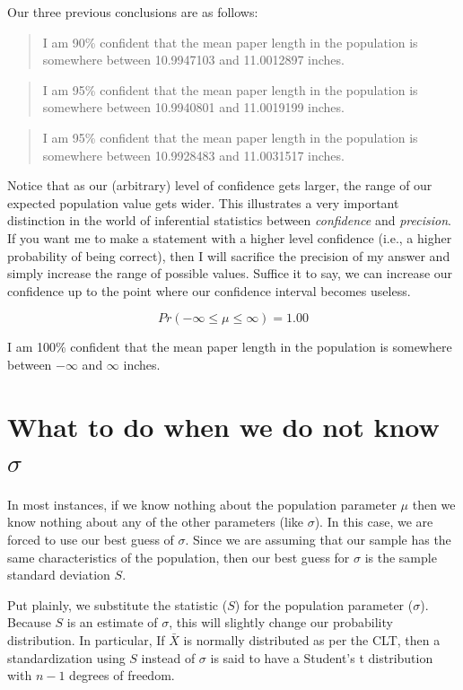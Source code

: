 \documentclass[
]{book}
\begin{document}
Our three previous conclusions are as follows:

\begin{quote}
I am 90\% confident that the mean paper length in the population is somewhere between 10.9947103 and 11.0012897 inches.
\end{quote}

\begin{quote}
I am 95\% confident that the mean paper length in the population is somewhere between 10.9940801 and 11.0019199 inches.
\end{quote}

\begin{quote}
I am 95\% confident that the mean paper length in the population is somewhere between 10.9928483 and 11.0031517 inches.
\end{quote}

Notice that as our (arbitrary) level of confidence gets larger, the range of our expected population value gets wider. This illustrates a very important distinction in the world of inferential statistics between \emph{confidence} and \emph{precision}. If you want me to make a statement with a higher level confidence (i.e., a higher probability of being correct), then I will sacrifice the precision of my answer and simply increase the range of possible values. Suffice it to say, we can increase our confidence up to the point where our confidence interval becomes useless.

\[ Pr(-\infty \leq \mu \leq \infty) = 1.00 \]

I am 100\% confident that the mean paper length in the population is somewhere between \(-\infty\) and \(\infty\) inches.

\hypertarget{what-to-do-when-we-do-not-know-sigma}{%
\section{\texorpdfstring{What to do when we do not know \(\sigma\)}{What to do when we do not know \textbackslash sigma}}\label{what-to-do-when-we-do-not-know-sigma}}

In most instances, if we know nothing about the population parameter \(\mu\) then we know nothing about any of the other parameters (like \(\sigma\)). In this case, we are forced to use our best guess of \(\sigma\). Since we are assuming that our sample has the same characteristics of the population, then our best guess for \(\sigma\) is the sample standard deviation \(S\).

Put plainly, we substitute the statistic (\(S\)) for the population parameter (\(\sigma\)). Because \(S\) is an estimate of \(\sigma\), this will slightly change our probability distribution. In particular, If \(\bar{X}\) is normally distributed as per the CLT, then a standardization using \(S\) instead of \(\sigma\) is said to have a Student's t distribution with \(n-1\) degrees of freedom.
\end{document}
